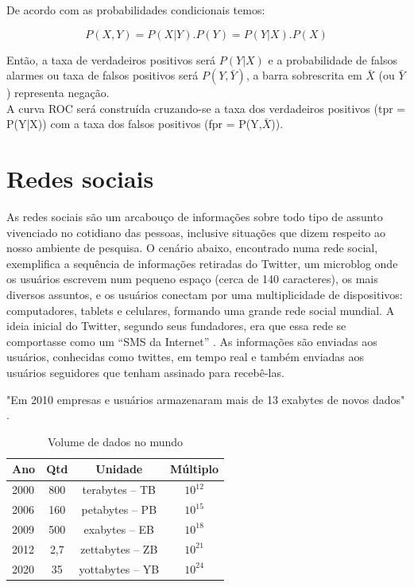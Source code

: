 De acordo com as probabilidades condicionais temos:

\begin{equation}
 P(X,Y) = P(X|Y).P(Y) = P(Y|X).P(X)
\end{equation}

Então, a taxa de verdadeiros positivos será $P(Y|X)$ e a probabilidade de falsos alarmes ou taxa de falsos positivos será $P(Y,\bar{Y})$, a barra sobrescrita em $\bar{X}$
(ou $\bar{Y}$) representa negação. \\
A curva ROC será construída cruzando-se a taxa dos verdadeiros positivos (tpr = P(Y|X)) com a taxa dos falsos positivos (fpr = P(Y,$\bar{X}$)).

\pagebreak

\section{Redes sociais}

As redes sociais são um arcabouço de informações sobre todo tipo de assunto vivenciado no cotidiano das pessoas, inclusive situações que dizem respeito ao nosso ambiente de pesquisa.
O cenário abaixo, encontrado numa rede social, exemplifica a sequência de informações retiradas do Twitter, um microblog onde os usuários escrevem num pequeno espaço (cerca de 140 caracteres), 
os mais diversos assuntos, e os usuários conectam por uma multiplicidade de dispositivos: computadores, tablets e celulares, formando uma grande rede social mundial. 
A ideia inicial do Twitter, segundo seus fundadores, era que essa rede se comportasse como um ``SMS da Internet'' \cite{Twitter2015}. 
As informações são enviadas aos usuários, conhecidas como twittes, em tempo real e também enviadas aos usuários seguidores que tenham assinado para recebê-las.

"Em 2010 empresas e usuários armazenaram mais de 13 exabytes de novos dados" \cite{bigdataQualquerUm}.

\begin{table}[!ht]
\centering
\caption{Volume de dados no mundo}
\vspace{1mm}
\begin{tabular}{l|c|c|c}
\hline
\textbf{Ano} & \textbf{Qtd} & \textbf{Unidade} & \textbf{Múltiplo}\\
\hline
2000 & 800 & terabytes – TB & $10^{12}$\\
2006 & 160 & petabytes – PB & $10^{15}$\\
2009 & 500 & exabytes – EB & $10^{18}$ \\
2012 & 2,7 & zettabytes – ZB & $10^{21}$\\
2020 & 35 & yottabytes – YB & $10^{24}$\\
\end{tabular}
\end{table}



